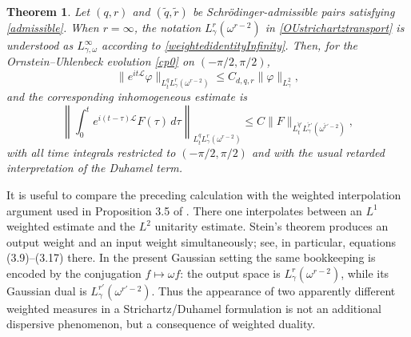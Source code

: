 \documentclass[11pt,a4paper]{amsart}
\def \vf{\varphi}
\numberwithin{equation}{section}
\newtheorem{theorem}{Theorem}[section]
\numberwithin{equation}{section}
\begin{document}
\begin{theorem}\label{T:OUstrichartztransport}
Let $(q,r)$ and $(\widetilde q,\widetilde r)$ be Schr\"odinger-admissible pairs satisfying \eqref{admissible}.  When $r=\infty$, the notation $L^r_\gamma(\omega^{r-2})$ in \eqref{OUstrichartztransport} is understood as $L^\infty_{\gamma,\omega}$ according to \eqref{weightedidentityInfinity}.  Then, for the Ornstein--Uhlenbeck evolution \eqref{cp0} on $(-\pi/2,\pi/2)$,
\begin{equation}\label{OUstrichartztransport}
 \|e^{it\mathscr L}\vf\|_{L^q_tL^r_\gamma(\omega^{r-2})}
 \le C_{d,q,r}\|\vf\|_{L^2_\gamma},
\end{equation}
and the corresponding inhomogeneous estimate is
\begin{equation}\label{OUstrichartzInhomTransport}
 \left\|\int_0^t e^{i(t-\tau)\mathscr L}F(\tau)\,d\tau\right\|_{L^q_tL^r_\gamma(\omega^{r-2})}
 \le C\|F\|_{L^{\widetilde q'}_tL^{\widetilde r'}_\gamma(\omega^{\widetilde r'-2})},
\end{equation}
with all time integrals restricted to $(-\pi/2,\pi/2)$ and with the usual retarded interpretation of the Duhamel term.
\end{theorem}

It is useful to compare the preceding calculation with the weighted interpolation argument used in Proposition 3.5 of \cite{GSBessel}.  There one interpolates between an $L^1$ weighted estimate and the $L^2$ unitarity estimate.  Stein's theorem produces an output weight and an input weight simultaneously; see, in particular, equations (3.9)--(3.17) there.  In the present Gaussian setting the same bookkeeping is encoded by the conjugation $f\mapsto\omega f$: the output space is $L^r_\gamma(\omega^{r-2})$, while its Gaussian dual is $L^{r'}_\gamma(\omega^{r'-2})$.  Thus the appearance of two apparently different weighted measures in a Strichartz/Duhamel formulation is not an additional dispersive phenomenon, but a consequence of weighted duality.
\end{document}
